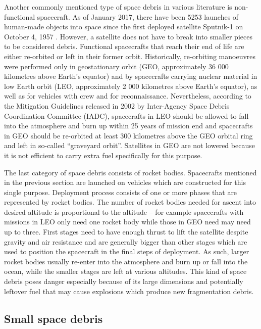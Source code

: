 	Another commonly mentioned type of space debris in various literature is non-functional spacecraft. As of January 2017, there have been 5253 launches of human-made objects into space since the first deployed satellite Sputnik-1 on October 4, 1957 \citep{esabr336}. However, a satellite does not have to break into smaller pieces to be considered debris. Functional spacecrafts that reach their end of life are either re-orbited or left in their former orbit. Historically, re-orbiting manoeuvres were performed only in geostationary orbit (GEO, approximately 36 000 kilometres above Earth's equator) and by spacecrafts carrying nuclear material in low Earth orbit (LEO, approximately 2 000 kilometres above Earth's equator), as well as for vehicles with crew and for reconnaissance. Nevertheless, according to the Mitigation Guidelines released in 2002 by Inter-Agency Space Debris Coordination Committee (IADC), spacecrafts in LEO should be allowed to fall into the atmosphere and burn up within 25 years of mission end and spacecrafts in GEO should be re-orbited at least 300 kilometres above the GEO orbital ring and left in so-called “graveyard orbit”. Satellites in GEO are not lowered because it is not efficient to carry extra fuel specifically for this purpose.
	
	The last category of space debris consists of rocket bodies. Spacecrafts mentioned in the previous section are launched on vehicles which are constructed for this single purpose. Deployment process consists of one or more phases that are represented by rocket bodies. The number of rocket bodies needed for ascent into desired altitude is proportional to the altitude – for example spacecrafts with missions in LEO only need one rocket body while those in GEO need may need up to three. First stages need to have enough thrust to lift the satellite despite gravity and air resistance and are generally bigger than other stages which are used to position the spacecraft in the final steps of deployment. As such, larger rocket bodies usually re-enter into the atmosphere and burn up or fall into the ocean, while the smaller stages are left at various altitudes. This kind of space debris poses danger especially because of its large dimensions and potentially leftover fuel that may cause explosions which produce new fragmentation debris.
	
\subsection{Small space debris}\label{subsec:small_space_debris}

